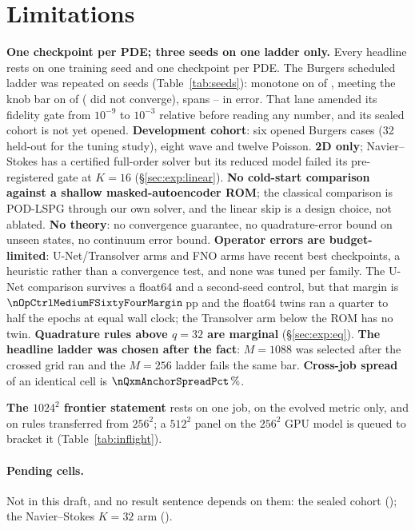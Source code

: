 \section{Limitations}
\label{sec:limitations}

\textbf{One checkpoint per PDE; three seeds on one ladder only.} Every
headline rests on one training seed and one checkpoint per PDE. The Burgers
scheduled ladder was repeated on \nSeedsCount{} seeds
(Table~\ref{tab:seeds}): monotone on \nSeedsMonotoneEvolved{} of
\nSeedsCount, meeting the knob bar on \nSeedsKnobBar{} of \nSeedsCount{}
(\nSeedsUnconvergedCells{} did not converge), spans
\nSeedsErrSpanMin--\nSeedsErrSpanMax{} in error. That lane amended its
fidelity gate from $10^{-9}$ to $10^{-3}$ relative before reading any number,
and its sealed cohort is not yet opened.
\textbf{Development cohort}: six opened Burgers cases (32 held-out for the
tuning study), eight wave and twelve Poisson.
\textbf{2D only}; Navier--Stokes has a certified full-order solver but its
reduced model failed its pre-registered gate at $K=16$ (\S\ref{sec:exp:linear}).
\textbf{No cold-start comparison against a shallow masked-autoencoder ROM}; the
classical comparison is POD-LSPG through our own solver, and the linear skip is
a design choice, not ablated. \textbf{No theory}: no convergence guarantee, no
quadrature-error bound on unseen states, no continuum error bound.
\textbf{Operator errors are budget-limited}: \nOpLaneImproving{}
U-Net/Transolver arms and \nOpFnoImproving{} FNO arms have recent best
checkpoints, a heuristic rather than a convergence test, and none was
tuned per family. The U-Net comparison survives
a float64 and a second-seed control, but that margin is
$\nOpCtrlMediumFSixtyFourMargin$\,pp and the float64 twins ran a quarter to half
the epochs at equal wall clock; the Transolver arm below the ROM has no twin.
\textbf{Quadrature rules above $q=32$ are marginal} (\S\ref{sec:exp:eq}).
\textbf{The headline ladder was chosen after the fact}: $M=1088$ was selected
after the crossed grid ran and the $M=256$ ladder fails the same bar.
\textbf{Cross-job spread} of an identical cell is $\nQxmAnchorSpreadPct\,\%$.

\textbf{The $1024^2$ frontier statement} rests on one job, on the evolved
metric only, and on rules transferred from $256^2$; a $512^2$ panel on the
$256^2$ GPU model is queued to bracket it (Table~\ref{tab:inflight}).

\paragraph{Pending cells.} Not in this draft, and no result sentence depends on
them: the sealed cohort (\nSeedsStatus); the Navier--Stokes $K=32$ arm
(\nNsKthirtyTwo).
